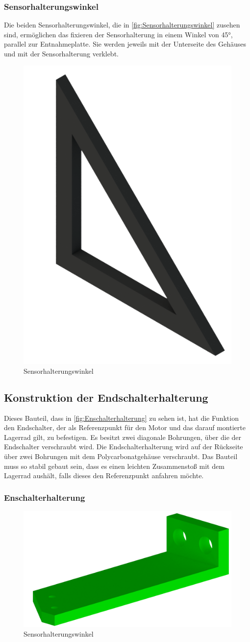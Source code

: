 \subsubsection{Sensorhalterungswinkel}


Die beiden Sensorhalterungswinkel, die in \autoref{fig:Sensorhalterungswinkel} zusehen sind, ermöglichen das fixieren der Sensorhalterung in einem Winkel von 45°, parallel zur
Entnahmeplatte. Sie werden jeweils mit der Unterseite des Gehäuses und mit der Sensorhalterung verklebt.

\begin{figure}[H]
    \centering
    \includegraphics[width=4 cm]{fig/mech/WinkelSensor}
    \caption{Sensorhalterungswinkel}
    \label{fig:Sensorhalterungswinkel}
\end{figure}

\subsection{Konstruktion der Endschalterhalterung}
Dieses Bauteil, dass in \autoref{fig:Enschalterhalterung} zu sehen ist, hat die Funktion den Endschalter, der als Referenzpunkt für den Motor und das darauf montierte
Lagerrad gilt, zu befestigen. Es besitzt zwei diagonale Bohrungen, über die der Endschalter verschraubt wird.
Die Endschalterhalterung wird auf der Rückseite über zwei Bohrungen mit dem Polycarbonatgehäuse verschraubt.
Das Bauteil muss so stabil gebaut sein, dass es einen leichten Zusammenstoß mit dem Lagerrad aushält, falls dieses
den Referenzpunkt anfahren möchte.

\subsubsection{Enschalterhalterung}
\begin{figure}[H]
    \centering
    \includegraphics[width=8 cm]{fig/mech/AufhaengungEndschalter.png}
    \caption{Sensorhalterungswinkel}
    \label{fig:Enschalterhalterung}
\end{figure}

